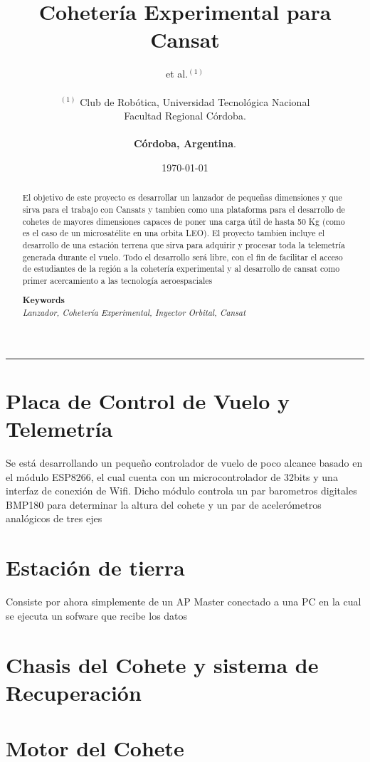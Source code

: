 \documentclass[a4paper]{article} %
\date{\today}
\def\keywords#1{\begin{center}{\bf Keywords}\\{#1}\end{center}} %
\begin{document}
\title{\textbf{Cohetería Experimental para Cansat}}

\author{et al.$^{(1)}$ \\\\
       $^{(1)}$ Club de Rob\'{o}tica, Universidad Tecnol\'{o}gica Nacional \\Facultad Regional C\'{o}rdoba. \\\\ \textbf{C\'{o}rdoba, Argentina}.\\ 
       }

\maketitle

\thispagestyle{empty}
\begin{center}\rule{0.9\textwidth}{0.1mm} \end{center} 


\begin{abstract}
El objetivo de este proyecto es desarrollar un lanzador de pequeñas dimensiones y que sirva para el trabajo con Cansats y tambien como una plataforma para el desarrollo de cohetes de mayores dimensiones capaces de poner una carga útil de hasta 50 Kg (como es el caso de un microsatélite en una orbita LEO). El proyecto tambien incluye el desarrollo de una estación terrena que sirva para adquirir y procesar toda la telemetría generada durante el vuelo. Todo el desarrollo será libre, con el fin de facilitar el acceso de estudiantes de la región a la cohetería experimental y al desarrollo de cansat como primer acercamiento a las tecnología aeroespaciales
\vspace*{.15cm}

\keywords{\textit{Lanzador, Cohetería Experimental, Inyector Orbital, Cansat}}

\vspace*{.1cm}
\end{abstract}

\section{Placa de Control de Vuelo y Telemetría}
Se está desarrollando un pequeño controlador de vuelo de poco alcance basado en el módulo ESP8266, el cual cuenta con un microcontrolador de 32bits y una interfaz de conexión de Wifi. Dicho módulo controla un par barometros digitales BMP180 para determinar la altura del cohete y un par de acelerómetros analógicos de tres ejes

\section{Estación de tierra}
Consiste por ahora simplemente de un AP Master conectado a una PC en la cual se ejecuta un sofware que recibe los datos

\section{Chasis del Cohete y sistema de Recuperación}


\section{Motor del Cohete}
\end{document}

